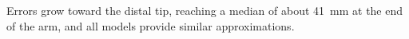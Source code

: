 Errors grow toward the distal tip, reaching a median of about 41~mm at the end of the arm, and all models provide similar approximations.
